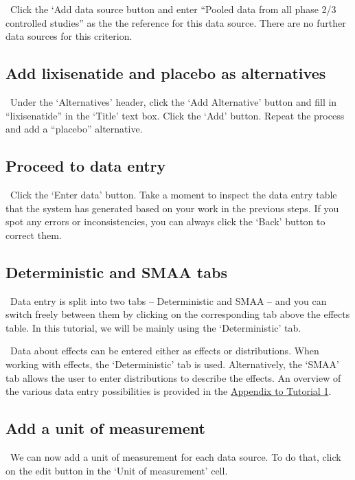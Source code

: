 \documentclass[00_mcda_tutorial.tex]{subfiles}
\begin{document}
\noindent \leftpointright \, Click the ‘Add data source button and enter “Pooled data from all phase 2/3 controlled studies” as the the reference for this data source.  There are no further data sources for this criterion.

\subsection*{Add lixisenatide and placebo as alternatives}
\noindent \leftpointright \, Under the ‘Alternatives’ header, click the ‘Add Alternative’ button and fill in “lixisenatide” in the ‘Title’ text box. Click the ‘Add’ button. Repeat the process and add a “placebo” alternative.

\subsection*{Proceed to data entry}
\noindent \leftpointright \, Click the ‘Enter data’ button. Take a moment to inspect the data entry table that the system has generated based on your work in the previous steps. If you spot any errors or inconsistencies, you can always click the ‘Back’ button to correct them.

\subsection*{Deterministic and SMAA tabs}
\noindent \faLightbulbO \, Data entry is split into two tabs – Deterministic and SMAA – and you can switch freely between them by clicking on the corresponding tab above the effects table. In this tutorial, we will be mainly using the ‘Deterministic’ tab.
\newline

\noindent \faGraduationCap \, Data about effects can be entered either as effects or distributions. When working with effects, the ‘Deterministic’ tab is used. Alternatively, the ‘SMAA’ tab allows the user to enter distributions to describe the effects. An overview of the various data entry possibilities is provided in the \hyperref[appendix1]{Appendix to Tutorial 1}.

\subsection*{Add a unit of measurement}
\noindent \leftpointright \, We can now add a unit of measurement for each data source. To do that, click on the edit button in the ‘Unit of measurement’ cell.
\newline
\end{document}
